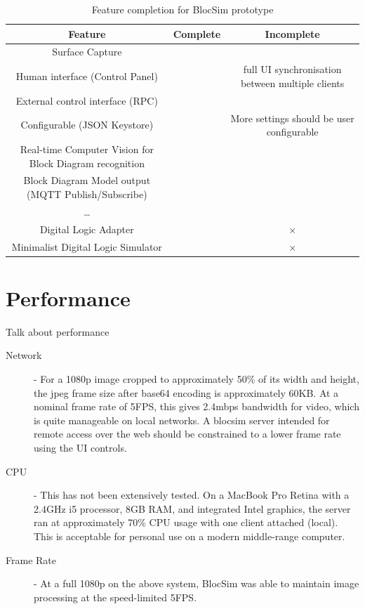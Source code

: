 \documentclass[titlesmallcaps, examinerscopy, copyrightpage]{uqthesis}
\newcommand{\tick}{\checkmark}
\newcommand{\gtick}{\color{ForestGreen} \tick }
\newcommand{\cross}{$\times$ }
\newcommand{\rcross}{\color{red} \cross }
\begin{document}
\begin{table}[ht!]
	\center
	\begin{tabular}{c|c|c}
		\hline
		Feature & Complete & Incomplete \\
		\hline
		Surface Capture & \gtick & \\
		Human interface (Control Panel) & \gtick & full UI synchronisation between multiple clients \\
		External control interface (RPC) & \gtick & \\
		Configurable (JSON Keystore) & \gtick & More settings should be user configurable \\
		Real-time Computer Vision for \newline Block Diagram recognition & \gtick & \\
		Block Diagram Model output \newline (MQTT Publish/Subscribe) & \gtick & \\
		\ldots & & \\
		Digital Logic Adapter & & \rcross \\
		Minimalist Digital Logic Simulator & & \rcross \\
		\hline
	\end{tabular}
	\caption{Feature completion for BlocSim prototype}
	\label{tab:completion}
\end{table} 

\newpage

\section{Performance}

Talk about performance

\begin{description}
	\item[Network] - For a 1080p image cropped to approximately 50\% of its width and height, the jpeg frame size after base64 encoding is approximately 60KB. At a nominal frame rate of 5FPS, this gives 2.4mbps bandwidth for video, which is quite manageable on local networks. A blocsim server intended for remote access over the web should be constrained to a lower frame rate using the UI controls.
	\item[CPU] - This has not been extensively tested. On a MacBook Pro Retina with a 2.4GHz i5 processor, 8GB RAM, and integrated Intel graphics, the server ran at approximately 70\% CPU usage with one client attached (local). This is acceptable for personal use on a modern middle-range computer. 
	\item[Frame Rate] - At a full 1080p on the above system, BlocSim was able to maintain image processing at the speed-limited 5FPS.
\end{description}
\end{document}
